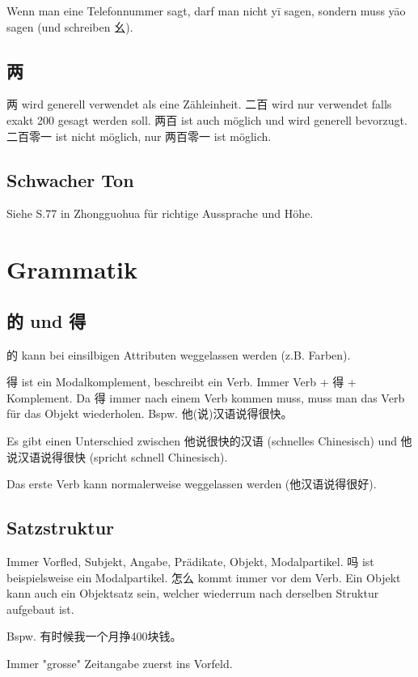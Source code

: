 \documentclass[UTF8]{ctexart}
\begin{document}
Wenn man eine Telefonnummer sagt, darf man nicht yī sagen, sondern muss yāo sagen (und schreiben 幺).

\subsection{两}

两 wird generell verwendet als eine Zähleinheit. 二百 wird nur verwendet falls exakt 200 gesagt werden soll. 两百 ist auch möglich und wird generell bevorzugt. 二百零一 ist nicht möglich, nur 两百零一 ist möglich.

\subsection{Schwacher Ton}

Siehe S.77 in Zhongguohua für richtige Aussprache und Höhe.

\section{Grammatik}

\subsection{的 und 得}

的 kann bei einsilbigen Attributen weggelassen werden (z.B. Farben).

得 ist ein Modalkomplement, beschreibt ein Verb. Immer Verb + 得 + Komplement. Da 得 immer nach einem Verb kommen muss, muss man das Verb für das Objekt wiederholen. Bspw. 他(说)汉语说得很快。

Es gibt einen Unterschied zwischen 他说很快的汉语 (schnelles Chinesisch) und 他说汉语说得很快 (spricht schnell Chinesisch).

Das erste Verb kann normalerweise weggelassen werden (他汉语说得很好).

\subsection{Satzstruktur}

Immer Vorfled, Subjekt, Angabe, Prädikate, Objekt, Modalpartikel.
吗 ist beispielsweise ein Modalpartikel. 怎么 kommt immer vor dem Verb. Ein Objekt kann auch ein Objektsatz sein, welcher wiederrum nach derselben Struktur aufgebaut ist.

Bspw. 有时候我一个月挣400块钱。

Immer "grosse" Zeitangabe zuerst ins Vorfeld.
\end{document}
